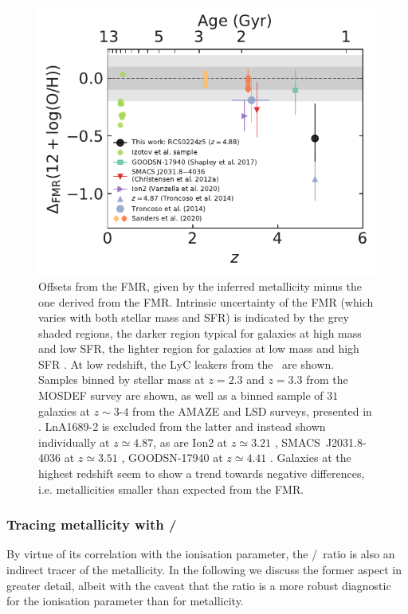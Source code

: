 \begin{figure}[t]
    \centering
    \includegraphics[width=0.6\linewidth]{"Plots/ChapterA/Delta_FMR"}
    \caption[Offsets from the FMR]{Offsets from the FMR, given by the inferred metallicity minus the one derived from the FMR. Intrinsic uncertainty of the FMR (which varies with both stellar mass and SFR) is indicated by the grey shaded regions, the darker region typical for galaxies at high mass and low SFR, the lighter region for galaxies at low mass and high SFR \citep[for details, see][]{2020MNRAS.491..944C}. At low redshift, the LyC leakers from the \Isample\ are shown. Samples binned by stellar mass at $z = 2.3$ and $z = 3.3$ from the MOSDEF survey \citep{2021ApJ...914...19S} are shown, as well as a binned sample of $31$ galaxies at $z \sim 3$-$4$ from the AMAZE and LSD surveys, presented in \citet{2014A&A...563A..58T}. LnA1689-2 is excluded from the latter and instead shown individually at $z \simeq 4.87$, as are Ion2 at $z \simeq 3.21$ \citep{2020MNRAS.491.1093V}, SMACS~J2031.8-4036 at $z \simeq 3.51$ \citep{2012MNRAS.427.1953C}, GOODSN-17940 at $z \simeq 4.41$ \citep{2017ApJ...846L..30S}. Galaxies at the highest redshift seem to show a trend towards negative differences, i.e. metallicities smaller than expected from the FMR.}
    \label{chAfig:NeIII/OII delta FMR}
\end{figure}

\subsubsection{Tracing metallicity with \texorpdfstring{\NeIII/\OII}{[Ne III]/[O II]}}
\label{chAsssec:Tracing metallicity with NeIII/OII}

By virtue of its correlation with the ionisation parameter, the \NeIII/\OII\ ratio is also an indirect tracer of the metallicity. In the following we discuss the former aspect in greater detail, albeit with the caveat that the ratio is a more robust diagnostic for the ionisation parameter than for metallicity.

